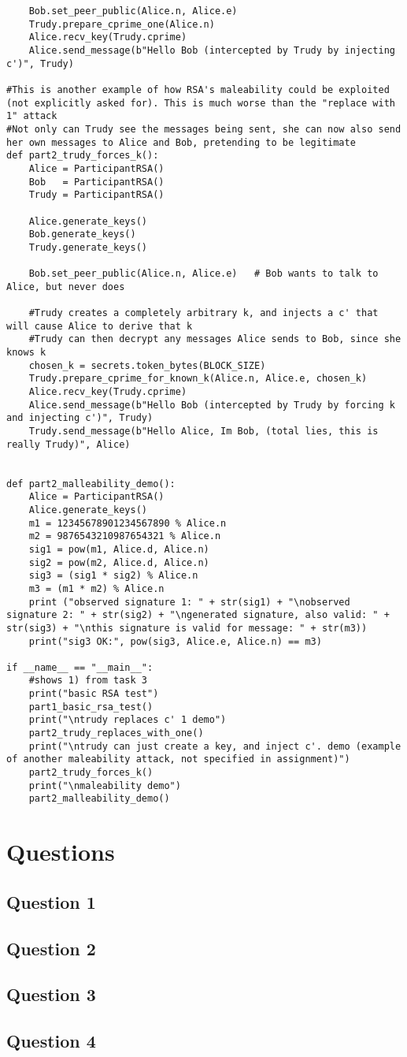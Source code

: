 \documentclass[11pt]{article}
\begin{document}
\begin{lstlisting}
    Bob.set_peer_public(Alice.n, Alice.e)
    Trudy.prepare_cprime_one(Alice.n)
    Alice.recv_key(Trudy.cprime)
    Alice.send_message(b"Hello Bob (intercepted by Trudy by injecting c')", Trudy)

#This is another example of how RSA's maleability could be exploited (not explicitly asked for). This is much worse than the "replace with 1" attack
#Not only can Trudy see the messages being sent, she can now also send her own messages to Alice and Bob, pretending to be legitimate
def part2_trudy_forces_k():
    Alice = ParticipantRSA()
    Bob   = ParticipantRSA()
    Trudy = ParticipantRSA()

    Alice.generate_keys()
    Bob.generate_keys()
    Trudy.generate_keys()

    Bob.set_peer_public(Alice.n, Alice.e)   # Bob wants to talk to Alice, but never does

    #Trudy creates a completely arbitrary k, and injects a c' that will cause Alice to derive that k
    #Trudy can then decrypt any messages Alice sends to Bob, since she knows k
    chosen_k = secrets.token_bytes(BLOCK_SIZE)
    Trudy.prepare_cprime_for_known_k(Alice.n, Alice.e, chosen_k)
    Alice.recv_key(Trudy.cprime)
    Alice.send_message(b"Hello Bob (intercepted by Trudy by forcing k and injecting c')", Trudy)
    Trudy.send_message(b"Hello Alice, Im Bob, (total lies, this is really Trudy)", Alice)


def part2_malleability_demo():
    Alice = ParticipantRSA()
    Alice.generate_keys()
    m1 = 12345678901234567890 % Alice.n
    m2 = 9876543210987654321 % Alice.n
    sig1 = pow(m1, Alice.d, Alice.n)
    sig2 = pow(m2, Alice.d, Alice.n)
    sig3 = (sig1 * sig2) % Alice.n
    m3 = (m1 * m2) % Alice.n
    print ("observed signature 1: " + str(sig1) + "\nobserved signature 2: " + str(sig2) + "\ngenerated signature, also valid: " + str(sig3) + "\nthis signature is valid for message: " + str(m3))
    print("sig3 OK:", pow(sig3, Alice.e, Alice.n) == m3)

if __name__ == "__main__":
    #shows 1) from task 3
    print("basic RSA test")
    part1_basic_rsa_test()
    print("\ntrudy replaces c' 1 demo")
    part2_trudy_replaces_with_one()
    print("\ntrudy can just create a key, and inject c'. demo (example of another maleability attack, not specified in assignment)")
    part2_trudy_forces_k()
    print("\nmaleability demo")
    part2_malleability_demo()
\end{lstlisting}


\section*{Questions}
\subsection*{Question 1}
\subsection*{Question 2}
\subsection*{Question 3}
\subsection*{Question 4}
\end{document}
